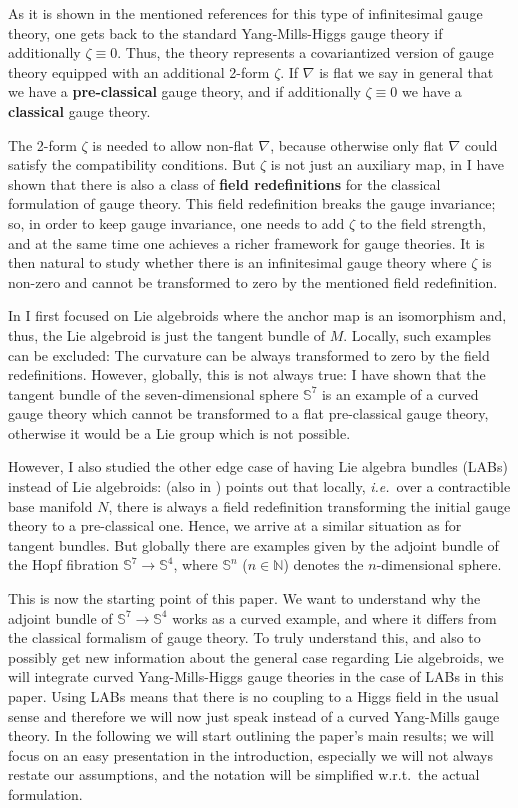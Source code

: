 \documentclass[a4paper,oneside,11pt,bibliography=totoc]{scrartcl}
\theoremstyle{plain}
\theoremstyle{remark}
\theoremstyle{definition}
\begin{document}
As it is shown in the mentioned references for this type of infinitesimal gauge theory, one gets back to the standard Yang-Mills-Higgs gauge theory if additionally $\zeta \equiv 0$. Thus, the theory represents a covariantized version of gauge theory equipped with an additional 2-form $\zeta$. If $\nabla$ is flat we say in general that we have a \textbf{pre-classical} gauge theory, and if additionally $\zeta \equiv 0$ we have a \textbf{classical} gauge theory.

The 2-form $\zeta$ is needed to allow non-flat $\nabla$, because otherwise only flat $\nabla$ could satisfy the compatibility conditions. But $\zeta$ is not just an auxiliary map, in \cite{MyThesis} I have shown that there is also a class of \textbf{field redefinitions} for the classical formulation of gauge theory. This field redefinition breaks the gauge invariance; so, in order to keep gauge invariance, one needs to add $\zeta$ to the field strength, and at the same time one achieves a richer framework for gauge theories. It is then natural to study whether there is an infinitesimal gauge theory where $\zeta$ is non-zero and cannot be transformed to zero by the mentioned field redefinition.

In \cite{MyThesis} I first focused on Lie algebroids where the anchor map is an isomorphism and, thus, the Lie algebroid is just the tangent bundle of $M$. Locally, such examples can be excluded: The curvature can be always transformed to zero by the field redefinitions. However, globally, this is not always true: I have shown that the tangent bundle of the seven-dimensional sphere $\mathds{S}^7$ is an example of a curved gauge theory which cannot be transformed to a flat pre-classical gauge theory, otherwise it would be a Lie group which is not possible.

However, I also studied the other edge case of having Lie algebra bundles (LABs) instead of Lie algebroids: \cite{MyThesis} (also in \cite{My1stpaper}) points out that locally, \textit{i.e.}~over a contractible base manifold $N$, there is always a field redefinition transforming the initial gauge theory to a pre-classical one. Hence, we arrive at a similar situation as for tangent bundles. But globally there are examples given by the adjoint bundle of the Hopf fibration $\mathds{S}^7 \to \mathds{S}^4$, where $\mathds{S}^n$ ($n \in \mathbb{N}$) denotes the $n$-dimensional sphere.

This is now the starting point of this paper. We want to understand why the adjoint bundle of $\mathds{S}^7 \to \mathds{S}^4$ works as a curved example, and where it differs from the classical formalism of gauge theory. To truly understand this, and also to possibly get new information about the general case regarding Lie algebroids, we will integrate curved Yang-Mills-Higgs gauge theories in the case of LABs in this paper. Using LABs means that there is no coupling to a Higgs field in the usual sense and therefore we will now just speak instead of a curved Yang-Mills gauge theory. In the following we will start outlining the paper's main results; we will focus on an easy presentation in the introduction, especially we will not always restate our assumptions, and the notation will be simplified w.r.t.\ the actual formulation.
\end{document}
